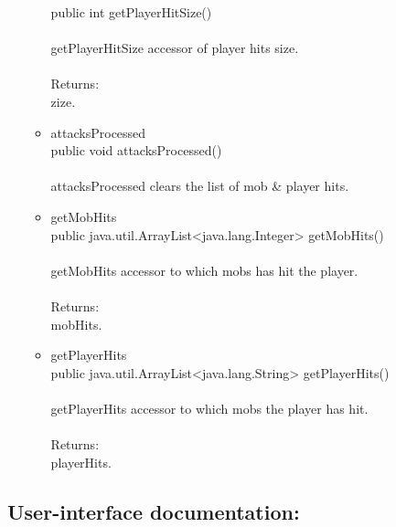 \documentclass[letterpaper]{article}
\begin{document}
\begin{itemize}
\begin{itemize}
												public int getPlayerHitSize() \\ \\
												getPlayerHitSize accessor of player hits size. \\ \\
												Returns: \\ 
												zize.\\
										\item	attacksProcessed \\
												public void attacksProcessed() \\ \\
												attacksProcessed clears the list of mob \& player hits. \\
										\item	getMobHits \\
												public java.util.ArrayList<java.lang.Integer> getMobHits() \\ \\
												getMobHits accessor to which mobs has hit the player. \\ \\
												Returns: \\
												mobHits. \\
										\item	getPlayerHits \\
												public java.util.ArrayList<java.lang.String> getPlayerHits() \\ \\
												getPlayerHits accessor to which mobs the player has hit. \\ \\
												Returns: \\
												playerHits. \\
									\end{itemize}
						\end{itemize}
			
			\vspace{0.2in}
			\subsection*{User-interface documentation:}
			\vspace{0.1in}
			
\end{document}

